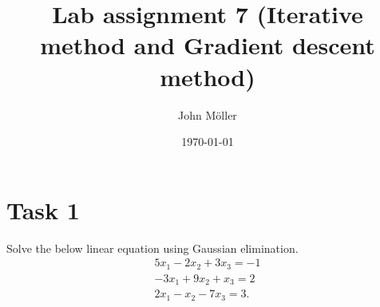 \documentclass[10pt]{article}
\author{John Möller}
\date{\today}
\title{Lab assignment 7 (Iterative method and Gradient descent method)}
\begin{document}
\maketitle

\section{Task 1}
\label{sec:org26d39f9}
\begin{exercise}[Task1]  \label{exe:Task1}
Solve the below linear equation using Gaussian elimination.
\begin{align*}
5x_1 - 2x_2 + 3x_3 = -1 \\
-3x_1 + 9x_2 + x_3 = 2 \\
2x_1 - x_2 - 7x_3 = 3
.
\end{align*}

\end{exercise}
\end{document}
